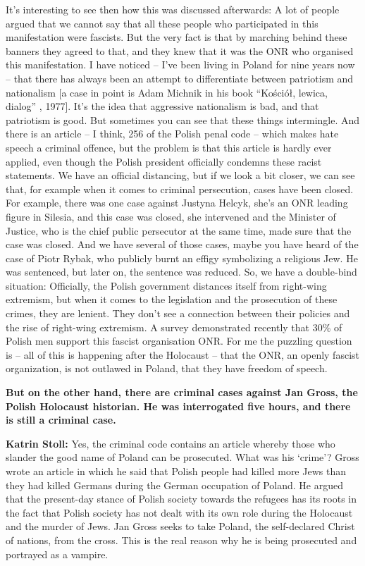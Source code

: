 It’s interesting to see then how this was discussed afterwards: A lot of people argued that we cannot say that all these people who participated in this manifestation were fascists. But the very fact is that by marching behind these banners they agreed to that, and they knew that it was the ONR who organised this manifestation. I have noticed – I’ve been living in Poland for nine years now – that there has always been an attempt to differentiate between patriotism and nationalism [a case in point is Adam Michnik in his book “Kościół, lewica, dialog” , 1977]. It’s the idea that aggressive nationalism is bad, and that patriotism is good. But sometimes you can see that these things intermingle. And there is an article – I think, 256 of the Polish penal code – which makes hate speech a criminal offence, but the problem is that this article is hardly ever applied, even though the Polish president officially condemns these racist statements. We have an official distancing, but if we look a bit closer, we can see that, for example when it comes to criminal persecution, cases have been closed. For example, there was one case against Justyna Helcyk, she’s an ONR leading figure in Silesia, and this case was closed, she intervened and the Minister of Justice, who is the chief public persecutor at the same time, made sure that the case was closed. And we have several of those cases, maybe you have heard of the case of Piotr Rybak, who publicly burnt an effigy symbolizing a religious Jew. He was sentenced, but later on, the sentence was reduced. So, we have a double-bind situation: Officially, the Polish government distances itself from right-wing extremism, but when it comes to the legislation and the prosecution of these crimes, they are lenient. They don’t see a connection between their policies and the rise of right-wing extremism. A survey demonstrated recently that 30\% of Polish men support this fascist organisation ONR. For me the puzzling question is – all of this is happening after the Holocaust – that the ONR, an openly fascist organization, is not outlawed in Poland, that they have freedom of speech.  

\textbf{But on the other hand, there are criminal cases against Jan Gross, the Polish Holocaust historian. He was interrogated five hours, and there is still a criminal case.} 

\textbf{Katrin Stoll:} Yes, the criminal code contains an article whereby those who slander the good name of Poland can be prosecuted. What was his ‘crime’? Gross wrote an article in which he said that Polish people had killed more Jews than they had killed Germans during the German occupation of Poland. He argued that the present-day stance of Polish society towards the refugees has its roots in the fact that Polish society has not dealt with its own role during the Holocaust and the murder of Jews. Jan Gross seeks to take Poland, the self-declared Christ of nations, from the cross. This is the real reason why he is being prosecuted and portrayed as a vampire.  

